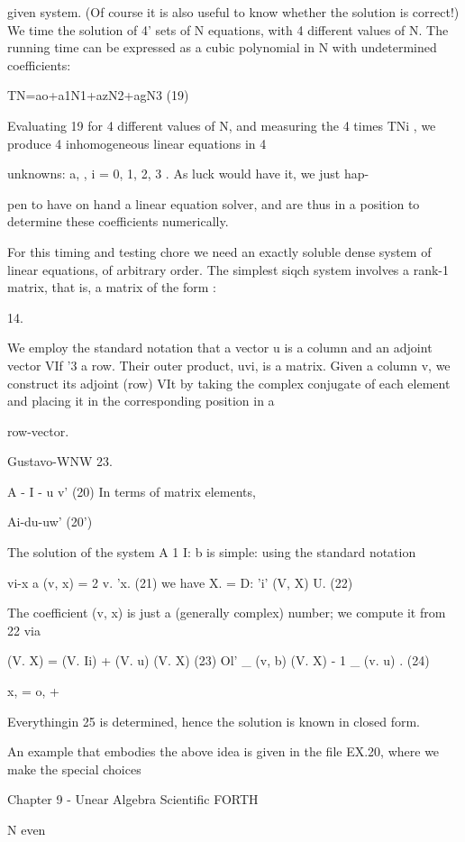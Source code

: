 {{{{{{{{given system. (Of course it is also useful to know whether the
solution is correct!) We time the solution of 4' sets of N equations,
with 4 different values of N. The running time can be expressed
as a cubic polynomial in N with undetermined coefficients:

TN=ao+a1N1+azN2+agN3 (19)

Evaluating 19 for 4 different values of N, and measuring the 4
times TNi , we produce 4 inhomogeneous linear equations in 4

unknowns: a, , i = 0, 1, 2, 3 . As luck would have it, we just hap-

pen to have on hand a linear equation solver, and are thus in a
position to determine these coefficients numerically.

For this timing and testing chore we need an exactly soluble dense
system of linear equations, of arbitrary order. The simplest siqch
system involves a rank-1 matrix, that is, a matrix of the form :

 

14.

We employ the standard notation that a vector u is a column and an adjoint vector VIf '3 a row.
Their outer product, uvi, is a matrix. Given a column v, we construct its adjoint (row) VIt by
taking the complex conjugate of each element and placing it in the corresponding position in a

row-vector.

Gustavo-WNW 23.

A - I - u v' (20)
In terms of matrix elements,

Ai-du-uw' (20')

The solution of the system A 1 I: b is simple: using the standard
notation

vi-x a (v, x) = 2 v. 'x. (21)
we have
X. = D: 'i' (V, X) U. (22)

The coefficient (v, x) is just a (generally complex) number; we
compute it from 22 via

(V. X) = (V. Ii) + (V. u) (V. X) (23)
Ol'
\_ (v, b)
(V. X) - 1 \_ (v. u) . (24)

x, = o, + %

Everythingin 25 is determined, hence the solution is known in
closed form.

An example that embodies the above idea is given in the file
EX.20, where we make the special choices

Chapter 9 - Unear Algebra Scientific FORTH

N even

}}}}}}}}
